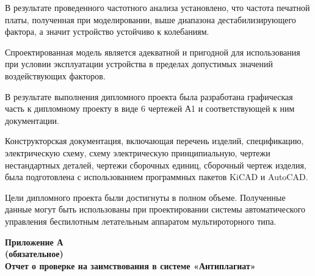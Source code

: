 В результате проведенного частотного анализа установлено, что частота
печатной платы, полученная при моделировании, выше диапазона
дестабилизирующего фактора, а значит устройство устойчиво к
колебаниям.

Спроектированная модель является адекватной и пригодной для
использования при условии эксплуатации устройства в пределах
допустимых значений воздействующих факторов.


В результате выполнения дипломного проекта была разработана
графическая часть к дипломному проекту в виде 6 чертежей А1 и
соответствующей к ним документации.

Конструкторская документация, включающая перечень изделий,
спецификацию, электрическую схему, схему электрическую принципиальную,
чертежи нестандартных деталей, чертежи сборочных единиц, сборочный
чертеж изделия, была подготовлена с использованием программных пакетов
KiCAD и AutoCAD.

Цели дипломного проекта были достигнуты в полном объеме. Полученные
данные могут быть использованы при проектировании системы
автоматического управления беспилотным летательным аппаратом
мультироторного типа.
\newpage

\renewcommand{\refname}{\textbf{Cписок использованных источников}}
\printbibliography[heading=bibintoc, title={Cписок использованных источников}]

\newpage


\begin{center}
\textbf{Приложение А}\\
\textbf{(обязательное)}\\
\textbf{Отчет о проверке на заимствования в системе «Антиплагиат»}
\end{center}
\newpage

